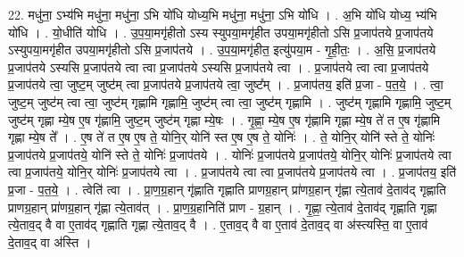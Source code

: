 \documentclass[17pt]{extarticle}
\begin{document}
22. मधु॑ना॒ ऽभ्य॑भि मधु॑ना॒ मधु॑ना॒ ऽभि यो॑धि योध्य॒भि मधु॑ना॒ मधु॑ना॒ ऽभि यो॑धि । . अ॒भि यो॑धि योध्य॒ भ्य॑भि यो॑धि । . यो॒धीति॑ योधि । . उ॒प॒या॒मगृ॑हीतो ऽस्य स्युपया॒मगृ॑हीत उपया॒मगृ॑हीतो ऽसि प्र॒जाप॑तये प्र॒जाप॑तये ऽस्युपया॒मगृ॑हीत उपया॒मगृ॑हीतो ऽसि प्र॒जाप॑तये । . उ॒प॒या॒मगृ॑हीत॒ इत्यु॑पया॒म - गृ॒ही॒तः॒ । . अ॒सि॒ प्र॒जाप॑तये प्र॒जाप॑तये ऽस्यसि प्र॒जाप॑तये त्वा त्वा प्र॒जाप॑तये ऽस्यसि प्र॒जाप॑तये त्वा । . प्र॒जाप॑तये त्वा त्वा प्र॒जाप॑तये प्र॒जाप॑तये त्वा॒ जुष्ट॒म् जुष्ट॑म् त्वा प्र॒जाप॑तये प्र॒जाप॑तये त्वा॒ जुष्ट᳚म् । . प्र॒जाप॑तय॒ इति॑ प्र॒जा - प॒त॒ये॒ । . त्वा॒ जुष्ट॒म् जुष्ट॑म् त्वा त्वा॒ जुष्ट॑म् गृह्णामि गृह्णामि॒ जुष्ट॑म् त्वा त्वा॒ जुष्ट॑म् गृह्णामि । . जुष्ट॑म् गृह्णामि गृह्णामि॒ जुष्ट॒म् जुष्ट॑म् गृह्णा म्ये॒ष ए॒ष गृ॑ह्णामि॒ जुष्ट॒म् जुष्ट॑म् गृह्णा म्ये॒षः । . गृ॒ह्णा॒ म्ये॒ष ए॒ष गृ॑ह्णामि गृह्णा म्ये॒ष ते॑ त ए॒ष गृ॑ह्णामि गृह्णा म्ये॒ष ते᳚ । . ए॒ष ते॑ त ए॒ष ए॒ष ते॒ योनि॒र् योनि॑ स्त ए॒ष ए॒ष ते॒ योनिः॑ । . ते॒ योनि॒र् योनि॑ स्ते ते॒ योनिः॑ प्र॒जाप॑तये प्र॒जाप॑तये॒ योनि॑ स्ते ते॒ योनिः॑ प्र॒जाप॑तये । . योनिः॑ प्र॒जाप॑तये प्र॒जाप॑तये॒ योनि॒र् योनिः॑ प्र॒जाप॑तये त्वा त्वा प्र॒जाप॑तये॒ योनि॒र् योनिः॑ प्र॒जाप॑तये त्वा । . प्र॒जाप॑तये त्वा त्वा प्र॒जाप॑तये प्र॒जाप॑तये त्वा । . प्र॒जाप॑तय॒ इति॑ प्र॒जा - प॒त॒ये॒ । . त्वेति॑ त्वा । . प्रा॒ण॒ग्र॒हान् गृ॑ह्णाति गृह्णाति प्राणग्र॒हान् प्रा॑णग्र॒हान् गृ॑ह्णा त्ये॒ताव॑ दे॒ताव॑द् गृह्णाति प्राणग्र॒हान् प्रा॑णग्र॒हान् गृ॑ह्णा त्ये॒ताव॑त् । . प्रा॒ण॒ग्र॒हानिति॑ प्राण - ग्र॒हान् । . गृ॒ह्णा॒ त्ये॒ताव॑ दे॒ताव॑द् गृह्णाति गृह्णा त्ये॒ताव॒द् वै वा ए॒ताव॑द् गृह्णाति गृह्णा त्ये॒ताव॒द् वै । . ए॒ताव॒द् वै वा ए॒ताव॑ दे॒ताव॒द् वा अ॑स्त्यस्ति॒ वा ए॒ताव॑ दे॒ताव॒द् वा अ॑स्ति । \newline
\end{document}

